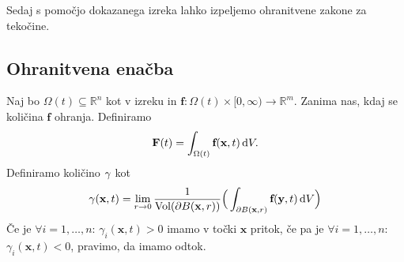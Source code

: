 \documentclass[mat2, tisk]{fmfdelo}
\newcommand{\R}{\mathbb R}
\newcommand{\bd}{\textbf}
\begin{document}
Sedaj s pomočjo dokazanega izreka lahko izpeljemo ohranitvene zakone za tekočine.

\subsection{Ohranitvena enačba} 

Naj bo $\Omega(t) \subseteq \R^n$ kot v izreku in $\bd{f}: \Omega(t) \times [0, \infty) \rightarrow \R^m$.
Zanima nas, kdaj se količina $\bd{f}$ ohranja. Definiramo 
\begin{equation}
\bd{F}(t) = \int_{\Omega(t)} \bd{f}(\bd{x}, t) \dif V.
\end{equation}
Definiramo količino $\bd{\text{$\gamma$}}$ kot 
\begin{equation}
\bd{\text{$\gamma$}}(\bd{x}, t) = \lim_{r \to 0} \frac{1}{\text{Vol}(\partial B(\bd{x}, r))} \Big(\int_{\partial B(\bd{x}, r)} \bd{f}(\bd{y}, t) \dif V \Big)
\end{equation}
Če je $\forall i=1,\dots, n$: $\gamma_i(\bd{x}, t) > 0$ imamo v točki $\bd{x}$ pritok, če pa je 
$\forall i=1,\dots, n$: $\gamma_i(\bd{x}, t) < 0$, pravimo, da imamo odtok.
\end{document}
